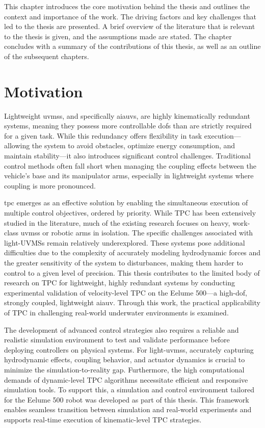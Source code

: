 \label{ch:introduction}
This chapter introduces the core motivation behind the thesis and outlines the
context and importance of the work. The driving factors and key challenges that
led to the thesis are presented. A brief overview of the literature that is
relevant to the thesis is given, and the assumptions made are
stated. The chapter concludes with a summary of the contributions of this thesis,
as well as an outline of the subsequent chapters.

\section{Motivation}
\label{sec:introduction:motivation}


Lightweight \glspl{uvms}, and specifically \glspl{aiauv}, are highly kinematically redundant systems, meaning they possess more controllable \glspl{dof} than are strictly required for a given task. While this redundancy offers flexibility in task execution—allowing the system to avoid obstacles, optimize energy consumption, and maintain stability—it also introduces significant control challenges. Traditional control methods often fall short when managing the coupling effects between the vehicle's base and its manipulator arms, especially in lightweight systems where coupling is more pronounced.

\Gls{tpc} emerges as an effective solution by enabling the simultaneous execution of multiple control objectives, ordered by priority. While TPC has been extensively studied in the literature, much of the existing research focuses on heavy, work-class \glspl{uvms} or robotic arms in isolation. The specific challenges associated with light-UVMSs remain relatively underexplored. These systems pose additional difficulties due to the complexity of accurately modeling hydrodynamic forces and the greater sensitivity of the system to disturbances, making them harder to control to a given level of precision.
This thesis contributes to the limited body of research on TPC for lightweight, highly redundant systems by conducting experimental validation of velocity-level TPC on the Eelume 500—a high-\gls{dof}, strongly coupled, lightweight \gls{aiauv}. Through this work, the practical applicability of TPC in challenging real-world underwater environments is examined.

The development of advanced control strategies also requires a reliable and realistic simulation environment to test and validate performance before deploying controllers on physical systems. For light-\gls{uvms}s, accurately capturing hydrodynamic effects, coupling behavior, and actuator dynamics is crucial to minimize the simulation-to-reality gap. Furthermore, the high computational demands of dynamic-level TPC algorithms necessitate efficient and responsive simulation tools.
To support this, a simulation and control environment tailored for the Eelume 500 robot was developed as part of this thesis. This framework enables seamless transition between simulation and real-world experiments and supports real-time execution of kinematic-level TPC strategies.


